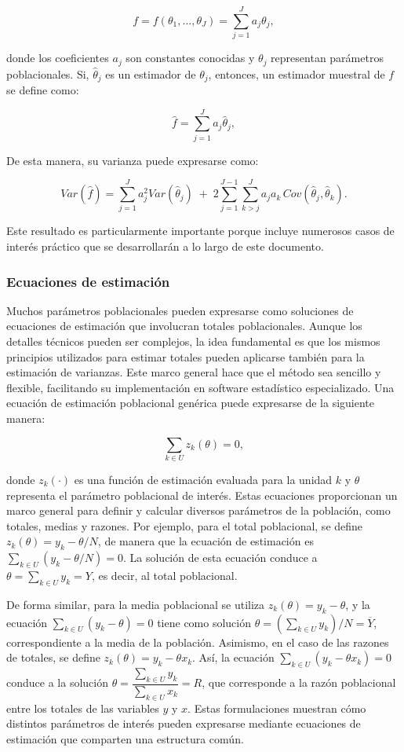 \documentclass[
  spanish,
  12pt,
]{book}
\begin{document}
\[
f=f(\theta_1,\ldots,\theta_J) = \sum_{j=1}^J a_j \theta_j,
\]

donde los coeficientes \(a_j\) son constantes conocidas y \(\theta_j\) representan parámetros poblacionales. Si, \(\hat\theta_j\) es un estimador de \(\theta_j\), entonces, un estimador muestral de \(f\) se define como:

\[
\hat{f} = \sum_{j=1}^J a_j \hat{\theta}_j,
\]

De esta manera, su varianza puede expresarse como:

\[
Var(\hat{f}) = \sum_{j=1}^J a_j^2 Var(\hat{\theta}_j)
\;+\;
2\sum_{j=1}^{J-1}\sum_{k>j}^J
a_j a_k \, Cov(\hat{\theta}_j,\hat{\theta}_k).
\]

Este resultado es particularmente importante porque incluye numerosos casos de interés práctico que se desarrollarán a lo largo de este documento.

\subsubsection{Ecuaciones de estimación}\label{ecuaciones-de-estimacion}

Muchos parámetros poblacionales pueden expresarse como soluciones de ecuaciones de estimación que involucran totales poblacionales. Aunque los detalles técnicos pueden ser complejos, la idea fundamental es que los mismos principios utilizados para estimar totales pueden aplicarse también para la estimación de varianzas. Este marco general hace que el método sea sencillo y flexible, facilitando su implementación en software estadístico especializado. Una ecuación de estimación poblacional genérica puede expresarse de la siguiente manera:

\[
\sum_{k\in U} z_k(\theta)=0,
\]

donde \(z_k(\cdot)\) es una función de estimación evaluada para la unidad \(k\) y \(\theta\) representa el parámetro poblacional de interés. Estas ecuaciones proporcionan un marco general para definir y calcular diversos parámetros de la población, como totales, medias y razones. Por ejemplo, para el total poblacional, se define \(z_k(\theta)=y_k-\theta/N\), de manera que la ecuación de estimación es \(\sum_{k\in U}(y_k-\theta/N)=0\). La solución de esta ecuación conduce a \(\theta=\sum_{k\in U} y_k = Y\), es decir, al total poblacional.

De forma similar, para la media poblacional se utiliza \(z_k(\theta)=y_k-\theta\), y la ecuación \(\sum_{k\in U}(y_k-\theta)=0\) tiene como solución \(\theta=\left(\sum_{k\in U} y_k\right)/N = \overline{Y}\), correspondiente a la media de la población. Asimismo, en el caso de las razones de totales, se define \(z_k(\theta)=y_k-\theta x_k\). Así, la ecuación \(\sum_{k\in U}(y_k-\theta x_k)=0\) conduce a la solución \(\theta=\dfrac{\sum_{k\in U} y_k}{\sum_{k\in U} x_k} = R\), que corresponde a la razón poblacional entre los totales de las variables \(y\) y \(x\). Estas formulaciones muestran cómo distintos parámetros de interés pueden expresarse mediante ecuaciones de estimación que comparten una estructura común.
\end{document}
